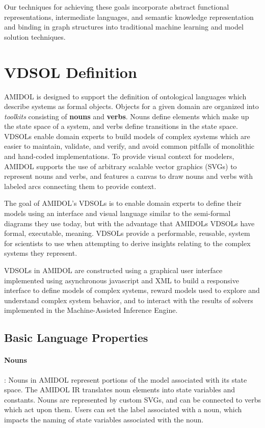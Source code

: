 \documentclass[11pt]{article}
\newcommand{\amidol}{\textsc{AMIDOL}}
\begin{document}
Our techniques for achieving these goals incorporate abstract functional representations, intermediate languages, and semantic knowledge representation and binding in graph structures into traditional machine learning and model solution techniques.

\section{VDSOL Definition}

\amidol{} is designed to support the definition of ontological languages which describe systems as formal objects.  Objects for a given domain are organized into \emph{toolkits} consisting of \textbf{nouns} and \textbf{verbs}.  Nouns define elements which make up the state space of a system, and verbs define transitions in the state space.  VDSOLs enable domain experts to build models of complex systems which are easier to maintain, validate, and verify, and avoid common pitfalls of monolithic and hand-coded implementations.  To provide visual context for modelers, \amidol{} supports the use of arbitrary scalable vector graphics (SVGs) to represent nouns and verbs, and features a canvas to draw nouns and verbs with labeled arcs connecting them to provide context.

The goal of \amidol{}'s VDSOLs is to enable domain experts to define their models using an interface and visual language similar to the semi-formal diagrams they use today, but with the advantage that \amidol{}s VDSOLs have formal, executable, meaning.  VDSOLs provide a performable, reusable, system for scientists to use when attempting to derive insights relating to the complex systems they represent.

VDSOLs in \amidol{} are constructed using a graphical user interface implemented using asynchronous javascript and XML to build a responsive interface to define models of complex systems, reward models used to explore and understand complex system behavior, and to interact with the results of solvers implemented in the Machine-Assisted Inference Engine.

\subsection{Basic Language Properties}
\paragraph{Nouns}: Nouns in \amidol{} represent portions of the model associated with its state space.  The \amidol{} IR translates noun elements into state variables and constants.  Nouns are represented by custom SVGs, and can be connected to verbs which act upon them.  Users can set the label associated with a noun, which impacts the naming of state variables associated with the noun.
\end{document}
